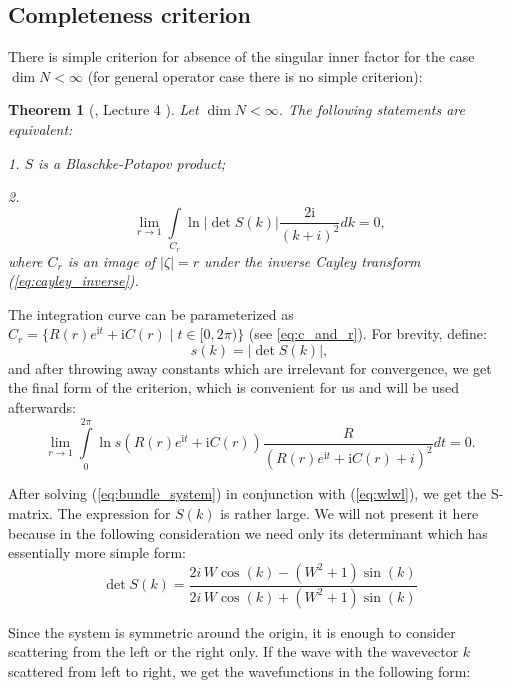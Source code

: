 \documentclass{birkjour}
\newtheorem{thm}{Theorem}[section]
\theoremstyle{definition}
\theoremstyle{remark}
\numberwithin{equation}{section}
\begin{document}
\subsection{Completeness criterion}
There is simple criterion for absence of the singular inner factor
for the case  $\dim  N < \infty$ (for general operator case there
is no simple criterion):

\begin{thm}[\cite{Nik}, Lecture 4 ] Let $\dim  N < \infty$. The following
statements are equivalent:

1.  $S$ is a Blaschke-Potapov  product;

2. \begin{equation}\label{eq:crit} \lim\limits_{r \to 1}
\int\limits_{C_r} \ln \left|\det S(k)\right| \frac{2
\mathrm{i}}{(k + i)^2} dk = 0,
\end{equation}
where $C_r$ is an image of $\left|\zeta\right| = r$ under the
inverse Cayley transform (\ref{eq:cayley_inverse}).
\end{thm}

The integration curve can be parameterized as $C_r = \{R(r)
e^{\mathrm{i} t} + \mathrm{i} C(r) \mid t \in [0, 2 \pi)\}$ (see
\ref{eq:c_and_r}). For brevity, define:
\[
s(k) = \left|\det S(k)\right|,
\]
and after throwing away constants which are irrelevant for
convergence, we get the final form of the criterion, which is
convenient for us and will be used afterwards:
\begin{equation}\label{eq:critp}
\lim\limits_{r \to 1} \int\limits_{0}^{2 \pi} \ln s(R(r)
e^{\mathrm{i} t} + \mathrm{i} C(r)) \frac{R}{(R(r) e^{\mathrm{i}
t} + \mathrm{i} C(r) + i)^2} dt = 0.
\end{equation}

After solving (\ref{eq:bundle_system}) in conjunction with
(\ref{eq:wlwl}), we get the S-matrix. The expression for $S(k)$ is
rather large. We will not present it here because in the following
consideration we need only its determinant which has essentially
more simple form:
\begin{equation}\label{det-s}
\det S(k) = \frac{2 i \, W \cos\left(k\right) -
{\left(W^{2} + 1\right)} \sin\left(k\right)}{2 i \,
W \cos\left(k\right) + {\left(W^{2} + 1\right)} \sin\left(k\right)}
\end{equation}

Since the system is symmetric around the origin, it is enough to consider scattering from the left or the right only. If the wave with the wavevector $k$ scattered from left to right, we get the wavefunctions in the following form:
\end{document}
